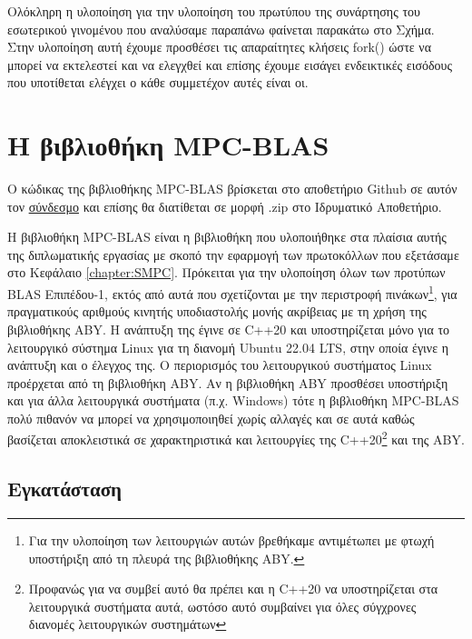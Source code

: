 Ολόκληρη η υλοποίηση για την υλοποίηση του πρωτύπου της συνάρτησης του εσωτερικού γινομένου που αναλύσαμε παραπάνω φαίνεται παρακάτω στο Σχήμα. Στην υλοποίηση αυτή έχουμε προσθέσει τις απαραίτητες κλήσεις fork() ώστε να μπορεί να εκτελεστεί και να ελεγχθεί και επίσης έχουμε εισάγει ενδεικτικές εισόδους που υποτίθεται ελέγχει ο κάθε συμμετέχον αυτές είναι οι.



\section{Η βιβλιοθήκη MPC-BLAS}

Ο κώδικας της βιβλιοθήκης MPC-BLAS βρίσκεται στο αποθετήριο Github σε αυτόν τον \href{https://github.com/st1064870/mpc-blas}{σύνδεσμο} και επίσης θα διατίθεται σε μορφή .zip στο Ιδρυματικό Αποθετήριο.

Η βιβλιοθήκη MPC-BLAS είναι η βιβλιοθήκη που υλοποιήθηκε στα πλαίσια αυτής της διπλωματικής εργασίας με σκοπό την εφαρμογή των πρωτοκόλλων που εξετάσαμε στο Κεφάλαιο \ref{chapter:SMPC}. Πρόκειται για την υλοποίηση όλων των προτύπων BLAS Επιπέδου-1, εκτός από αυτά που σχετίζονται με την περιστροφή πινάκων\footnote{Για την υλοποίηση των λειτουργιών αυτών βρεθήκαμε αντιμέτωπει με φτωχή υποστήριξη από τη πλευρά της βιβλιοθήκης ABY.}, για πραγματικούς αριθμούς κινητής υποδιαστολής μονής ακρίβειας με τη χρήση της βιβλιοθήκης ABY. Η ανάπτυξη της έγινε σε C++20 και υποστηρίζεται μόνο για το λειτουργικό σύστημα Linux για τη διανομή Ubuntu 22.04 LTS, στην οποία έγινε η ανάπτυξη και ο έλεγχος της. Ο περιορισμός του λειτουργικού συστήματος Linux προέρχεται από τη βιβλιοθήκη ABY. Αν η βιβλιοθήκη ABY προσθέσει υποστήριξη και για άλλα λειτουργικά συστήματα (π.χ. Windows) τότε η βιβλιοθήκη MPC-BLAS πολύ πιθανόν να μπορεί να χρησιμοποιηθεί χωρίς αλλαγές και σε αυτά καθώς βασίζεται αποκλειστικά σε χαρακτηριστικά και λειτουργίες της C++20\footnote{Προφανώς για να συμβεί αυτό θα πρέπει και η C++20 να υποστηρίζεται στα λειτουργικά συστήματα αυτά, ωστόσο αυτό συμβαίνει για όλες σύγχρονες διανομές λειτουργικών συστημάτων} και της ABY.

\subsection{Εγκατάσταση}

